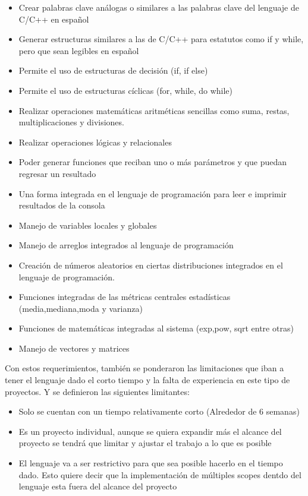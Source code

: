 \begin{itemize}
    \item Crear palabras clave análogas o similares a las palabras clave del lenguaje de C/C++ en español
    \item Generar estructuras similares a las de C/C++ para estatutos como if y while, pero que sean legibles en español
    \item Permite el uso de estructuras de decisión (if, if else)
    \item Permite el uso de estructuras cíclicas (for, while, do while)
    \item Realizar operaciones matemáticas aritméticas sencillas como suma, restas, multiplicaciones y divisiones.
    \item Realizar operaciones lógicas y relacionales
    \item Poder generar funciones que reciban uno o más parámetros y que puedan regresar un resultado
    \item Una forma integrada en el lenguaje de programación para leer e imprimir resultados de la consola
    \item Manejo de variables locales y globales
    \item Manejo de arreglos integrados al lenguaje de programación
    \item Creación de números aleatorios en ciertas distribuciones integrados en el lenguaje de programación.
    \item Funciones integradas de las métricas centrales estadísticas (media,mediana,moda y varianza)
    \item Funciones de matemáticas integradas al sistema (exp,pow, sqrt entre otras)
    \item Manejo de vectores y matrices
\end{itemize}

Con estos requerimientos, también se ponderaron las limitaciones que iban a tener el lenguaje dado el corto tiempo y la falta de experiencia en este tipo de proyectos. Y se definieron las siguientes limitantes:

\begin{itemize}
    \item Solo se cuentan con un tiempo relativamente corto (Alrededor de 6 semanas)
    \item Es un proyecto individual, aunque se quiera expandir más el alcance del proyecto se tendrá que limitar y ajustar el trabajo a lo que es posible
    \item El lenguaje va a ser restrictivo para que sea posible hacerlo en el tiempo dado. Esto quiere decir que la implementación de múltiples scopes dentdo del lenguaje esta fuera del alcance del proyecto
\end{itemize}

